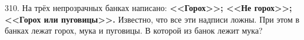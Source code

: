 310. На трёх непрозрачных банках написано: {\bf <<Горох>>; <<Не горох>>; <<Горох или пуговицы>>.} Известно, что все эти надписи ложны. При этом в банках лежат горох, мука и пуговицы. В которой из банок лежит мука?\\
